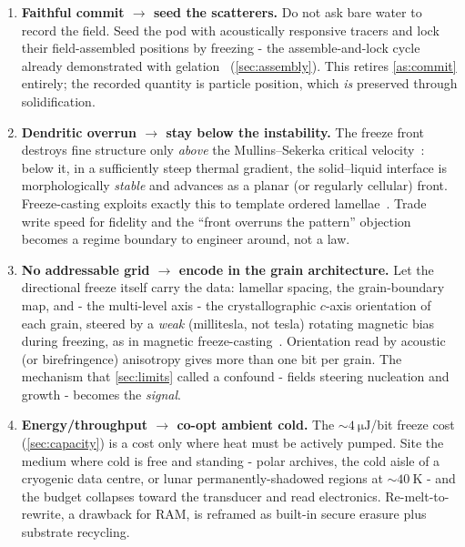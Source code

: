 \documentclass[11pt]{article}
\theoremstyle{definition}
\begin{document}
\begin{enumerate}[leftmargin=1.6em,nosep]
  \item \textbf{Faithful commit $\rightarrow$ seed the scatterers.} Do not ask bare water to
  record the field. Seed the pod with acoustically responsive tracers and lock their
  field-assembled positions by freezing - the assemble-and-lock cycle already demonstrated
  with gelation~\cite{melde2023assembly,olofsson2021hydrogel} (\cref{sec:assembly}). This
  retires \cref{as:commit} entirely; the recorded quantity is particle position, which
  \emph{is} preserved through solidification.
  \item \textbf{Dendritic overrun $\rightarrow$ stay below the instability.} The freeze front
  destroys fine structure only \emph{above} the Mullins--Sekerka critical
  velocity~\cite{mullins1964stability}: below it, in a sufficiently steep thermal gradient,
  the solid--liquid interface is morphologically \emph{stable} and advances as a planar (or
  regularly cellular) front. Freeze-casting exploits exactly this to template ordered
  lamellae~\cite{deville2006freezecast}. Trade write speed for fidelity and the
  ``front overruns the pattern'' objection becomes a regime boundary to engineer around, not
  a law.
  \item \textbf{No addressable grid $\rightarrow$ encode in the grain architecture.} Let the
  directional freeze itself carry the data: lamellar spacing, the grain-boundary map, and -
  the multi-level axis - the crystallographic $c$-axis orientation of each grain, steered by a
  \emph{weak} (millitesla, not tesla) rotating magnetic bias during freezing, as in magnetic
  freeze-casting~\cite{porter2012magnetic}. Orientation read by acoustic (or birefringence)
  anisotropy gives more than one bit per grain. The mechanism that
  \cref{sec:limits} called a confound - fields steering nucleation and growth - becomes the
  \emph{signal}.
  \item \textbf{Energy/throughput $\rightarrow$ co-opt ambient cold.} The ${\sim}\qty{4}{\micro\joule}$/bit
  freeze cost (\cref{sec:capacity}) is a cost only where heat must be actively pumped. Site
  the medium where cold is free and standing - polar archives, the cold aisle of a cryogenic
  data centre, or lunar permanently-shadowed regions at ${\sim}\qty{40}{\kelvin}$ - and the
  budget collapses toward the transducer and read electronics. Re-melt-to-rewrite, a drawback
  for RAM, is reframed as built-in secure erasure plus substrate recycling.
\end{enumerate}
\end{document}
